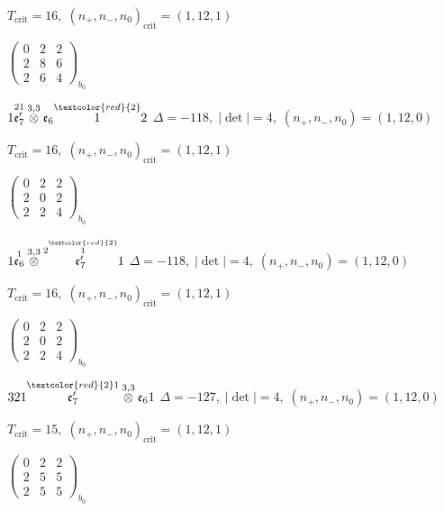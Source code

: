 \documentclass[10pt]{article}
\begin{document}
\hspace{1em}$T_{\text{crit}}=16,\; (n_+,n_-,n_0)_{\text{crit}}=(1,12,1)$

\hspace{2em}$\left(\begin{smallmatrix}0 & 2 & 2 \\ 2 & 8 & 6 \\ 2 & 6 & 4\end{smallmatrix}\right)_{\!b_0}$

$1\overset{21}{\mathfrak{e}_7'}\overset{3,3}{\otimes}\mathfrak{e}_6\overset{\textcolor{red}{2}}{1}2$ \quad $\Delta=-118,\; |\det|=4,\; (n_+,n_-,n_0)=(1,12,0)$

\hspace{1em}$T_{\text{crit}}=16,\; (n_+,n_-,n_0)_{\text{crit}}=(1,12,1)$

\hspace{2em}$\left(\begin{smallmatrix}0 & 2 & 2 \\ 2 & 0 & 2 \\ 2 & 2 & 4\end{smallmatrix}\right)_{\!b_0}$

\smallskip

$1\overset{1}{\mathfrak{e}_6}\overset{3,3}{\otimes}\overset{2\overset{\textcolor{red}{2}}{1}}{\mathfrak{e}_7'}1$ \quad $\Delta=-118,\; |\det|=4,\; (n_+,n_-,n_0)=(1,12,0)$

\hspace{1em}$T_{\text{crit}}=16,\; (n_+,n_-,n_0)_{\text{crit}}=(1,12,1)$

\hspace{2em}$\left(\begin{smallmatrix}0 & 2 & 2 \\ 2 & 0 & 2 \\ 2 & 2 & 4\end{smallmatrix}\right)_{\!b_0}$

\smallskip

$321\overset{\textcolor{red}{2}1}{\mathfrak{e}_7'}\overset{3,3}{\otimes}\mathfrak{e}_61$ \quad $\Delta=-127,\; |\det|=4,\; (n_+,n_-,n_0)=(1,12,0)$

\hspace{1em}$T_{\text{crit}}=15,\; (n_+,n_-,n_0)_{\text{crit}}=(1,12,1)$

\hspace{2em}$\left(\begin{smallmatrix}0 & 2 & 2 \\ 2 & 5 & 5 \\ 2 & 5 & 5\end{smallmatrix}\right)_{\!b_0}$
\end{document}
